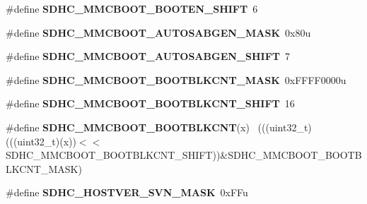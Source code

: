 \begin{DoxyCompactItemize}
\item 
\hypertarget{group___s_d_h_c___register___masks_ga1c83fde2fa55c8091ecd1768300614be}{}\#define {\bfseries S\+D\+H\+C\+\_\+\+M\+M\+C\+B\+O\+O\+T\+\_\+\+B\+O\+O\+T\+E\+N\+\_\+\+S\+H\+I\+F\+T}~6\label{group___s_d_h_c___register___masks_ga1c83fde2fa55c8091ecd1768300614be}

\item 
\hypertarget{group___s_d_h_c___register___masks_gaf80857b20ac681cf157b8012b2cbaaa3}{}\#define {\bfseries S\+D\+H\+C\+\_\+\+M\+M\+C\+B\+O\+O\+T\+\_\+\+A\+U\+T\+O\+S\+A\+B\+G\+E\+N\+\_\+\+M\+A\+S\+K}~0x80u\label{group___s_d_h_c___register___masks_gaf80857b20ac681cf157b8012b2cbaaa3}

\item 
\hypertarget{group___s_d_h_c___register___masks_ga2115330345a0a216c1d1721e84b32ea2}{}\#define {\bfseries S\+D\+H\+C\+\_\+\+M\+M\+C\+B\+O\+O\+T\+\_\+\+A\+U\+T\+O\+S\+A\+B\+G\+E\+N\+\_\+\+S\+H\+I\+F\+T}~7\label{group___s_d_h_c___register___masks_ga2115330345a0a216c1d1721e84b32ea2}

\item 
\hypertarget{group___s_d_h_c___register___masks_ga29920c6061ebeaf7ebbba8dadf5bdf21}{}\#define {\bfseries S\+D\+H\+C\+\_\+\+M\+M\+C\+B\+O\+O\+T\+\_\+\+B\+O\+O\+T\+B\+L\+K\+C\+N\+T\+\_\+\+M\+A\+S\+K}~0x\+F\+F\+F\+F0000u\label{group___s_d_h_c___register___masks_ga29920c6061ebeaf7ebbba8dadf5bdf21}

\item 
\hypertarget{group___s_d_h_c___register___masks_ga353934078a055823e50cdc2564097c67}{}\#define {\bfseries S\+D\+H\+C\+\_\+\+M\+M\+C\+B\+O\+O\+T\+\_\+\+B\+O\+O\+T\+B\+L\+K\+C\+N\+T\+\_\+\+S\+H\+I\+F\+T}~16\label{group___s_d_h_c___register___masks_ga353934078a055823e50cdc2564097c67}

\item 
\hypertarget{group___s_d_h_c___register___masks_ga1fd5ae6efab13d3c81409737038164cc}{}\#define {\bfseries S\+D\+H\+C\+\_\+\+M\+M\+C\+B\+O\+O\+T\+\_\+\+B\+O\+O\+T\+B\+L\+K\+C\+N\+T}(x)                          ~(((uint32\+\_\+t)(((uint32\+\_\+t)(x))$<$$<$S\+D\+H\+C\+\_\+\+M\+M\+C\+B\+O\+O\+T\+\_\+\+B\+O\+O\+T\+B\+L\+K\+C\+N\+T\+\_\+\+S\+H\+I\+F\+T))\&S\+D\+H\+C\+\_\+\+M\+M\+C\+B\+O\+O\+T\+\_\+\+B\+O\+O\+T\+B\+L\+K\+C\+N\+T\+\_\+\+M\+A\+S\+K)\label{group___s_d_h_c___register___masks_ga1fd5ae6efab13d3c81409737038164cc}

\item 
\hypertarget{group___s_d_h_c___register___masks_ga922683bd06f7936f2978aac6f943ca90}{}\#define {\bfseries S\+D\+H\+C\+\_\+\+H\+O\+S\+T\+V\+E\+R\+\_\+\+S\+V\+N\+\_\+\+M\+A\+S\+K}~0x\+F\+Fu\label{group___s_d_h_c___register___masks_ga922683bd06f7936f2978aac6f943ca90}


\end{DoxyCompactItemize}
